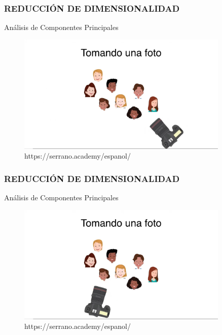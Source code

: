 \documentclass{beamer}
\begin{document}
\begin{frame}
\frametitle{REDUCCIÓN DE DIMENSIONALIDAD}
\begin{block}{Análisis de Componentes Principales}	
	\begin{figure}
		\includegraphics[width=0.9\textwidth]{PCA/IMG_3528.jpg}
		\caption{https://serrano.academy/espanol/}
	\end{figure}
\end{block}
\end{frame}

\begin{frame}
\frametitle{REDUCCIÓN DE DIMENSIONALIDAD}
\begin{block}{Análisis de Componentes Principales}	
	\begin{figure}
		\includegraphics[width=0.9\textwidth]{PCA/IMG_3529.jpg}
		\caption{https://serrano.academy/espanol/}
	\end{figure}
\end{block}
\end{frame}
\end{document}
